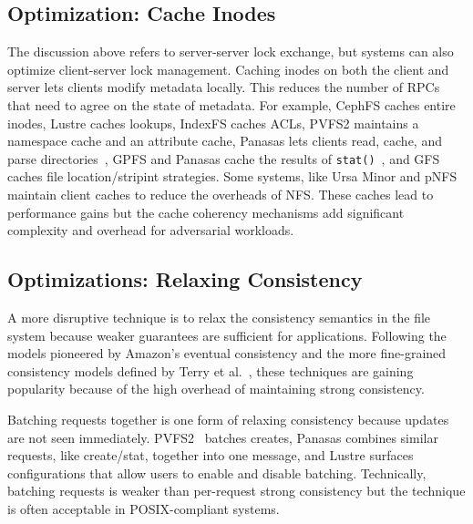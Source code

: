 \subsection{Optimization: Cache Inodes}

The discussion above refers to server-server lock exchange, but systems can
also optimize client-server lock management. Caching inodes on both the client
and server lets clients modify metadata locally.  This reduces the number of
RPCs that need to agree on the state of metadata.  For example, CephFS caches
entire inodes, Lustre caches lookups, IndexFS caches ACLs, PVFS2 maintains a
namespace cache and an attribute cache, Panasas lets clients read, cache, and
parse directories~\cite{welch:fast08-panasas}, GPFS and Panasas cache the
results of \texttt{stat()}~\cite{docs:cephcaps, schmuck:fast2002-gpfs,
wang:tech09-lustre, depardon:tech13-survey}, and GFS caches file
location/stripint strategies.  Some systems, like Ursa Minor and pNFS maintain
client caches to reduce the overheads of NFS. These caches lead to performance
gains but the cache coherency mechanisms add significant complexity and
overhead for adversarial workloads.

\subsection{Optimizations: Relaxing Consistency}

A more disruptive technique is to relax the consistency semantics in the file
system because weaker guarantees are sufficient for applications. Following the
models pioneered by Amazon's eventual consistency and the more fine-grained
consistency models defined by Terry et al.~\cite{baseball}, these techniques
are gaining popularity because of the high overhead of maintaining strong
consistency.

Batching requests together is one form of relaxing consistency because updates
are not seen immediately. PVFS2~\cite{PVFS2} batches creates, Panasas combines
similar requests, like create/stat, together into one message, and Lustre
surfaces configurations that allow users to enable and disable batching.
Technically, batching requests is weaker than per-request strong consistency
but the technique is often acceptable in POSIX-compliant systems.

